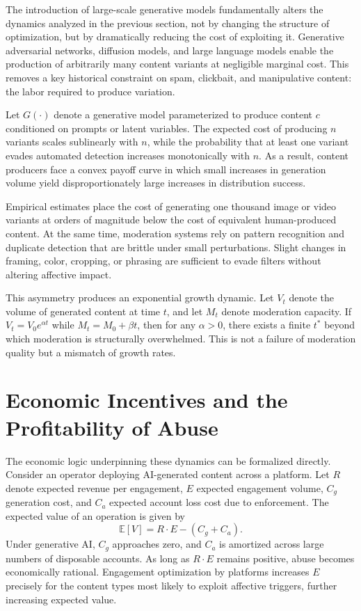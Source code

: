 \documentclass[11pt,oneside]{article}
\begin{document}
The introduction of large-scale generative models fundamentally alters the dynamics analyzed in the previous section, not by changing the structure of optimization, but by dramatically reducing the cost of exploiting it. Generative adversarial networks, diffusion models, and large language models enable the production of arbitrarily many content variants at negligible marginal cost. This removes a key historical constraint on spam, clickbait, and manipulative content: the labor required to produce variation.

Let \( G(\cdot) \) denote a generative model parameterized to produce content \( c \) conditioned on prompts or latent variables. The expected cost of producing \( n \) variants scales sublinearly with \( n \), while the probability that at least one variant evades automated detection increases monotonically with \( n \). As a result, content producers face a convex payoff curve in which small increases in generation volume yield disproportionately large increases in distribution success.

Empirical estimates place the cost of generating one thousand image or video variants at orders of magnitude below the cost of equivalent human-produced content. At the same time, moderation systems rely on pattern recognition and duplicate detection that are brittle under small perturbations. Slight changes in framing, color, cropping, or phrasing are sufficient to evade filters without altering affective impact.

This asymmetry produces an exponential growth dynamic. Let \( V_t \) denote the volume of generated content at time \( t \), and let \( M_t \) denote moderation capacity. If \( V_t = V_0 e^{\alpha t} \) while \( M_t = M_0 + \beta t \), then for any \( \alpha > 0 \), there exists a finite \( t^\ast \) beyond which moderation is structurally overwhelmed. This is not a failure of moderation quality but a mismatch of growth rates.

\section{Economic Incentives and the Profitability of Abuse}

The economic logic underpinning these dynamics can be formalized directly. Consider an operator deploying AI-generated content across a platform. Let \( R \) denote expected revenue per engagement, \( E \) expected engagement volume, \( C_g \) generation cost, and \( C_a \) expected account loss cost due to enforcement. The expected value of an operation is given by
\[
\mathbb{E}[V] = R \cdot E - (C_g + C_a).
\]
Under generative AI, \( C_g \) approaches zero, and \( C_a \) is amortized across large numbers of disposable accounts. As long as \( R \cdot E \) remains positive, abuse becomes economically rational. Engagement optimization by platforms increases \( E \) precisely for the content types most likely to exploit affective triggers, further increasing expected value.
\end{document}
